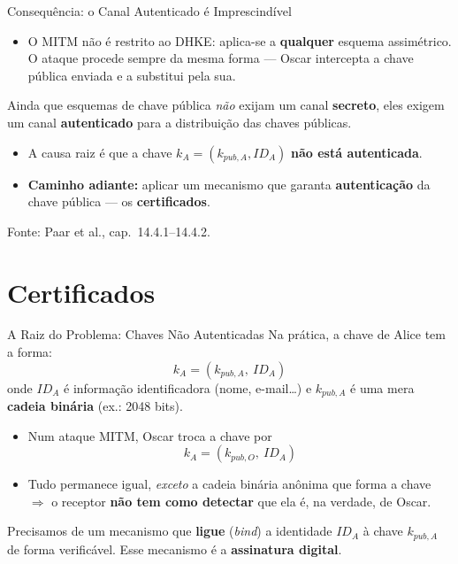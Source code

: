 \documentclass{beamer}
\begin{document}
\begin{frame}{Consequência: o Canal Autenticado é Imprescindível}
    \begin{itemize}
        \item O MITM \alert{não} é restrito ao DHKE: aplica-se a \textbf{qualquer} esquema assimétrico. O ataque procede sempre da mesma forma --- Oscar intercepta a chave pública enviada e a substitui pela sua.
    \end{itemize}
    \medskip
    \begin{tcolorbox}[colback=red!5,colframe=red!60!black,boxrule=0.5pt]
        \centering\footnotesize
        Ainda que esquemas de chave pública \emph{não} exijam um canal \textbf{secreto}, eles exigem um canal \textbf{autenticado} para a distribuição das chaves públicas.
    \end{tcolorbox}
    \medskip
    \begin{itemize}
        \footnotesize
        \item A causa raiz é que a chave $k_{A} = (k_{pub,A}, ID_A)$ \textbf{não está autenticada}.
        \item \textbf{Caminho adiante:} aplicar um mecanismo que garanta \textbf{autenticação} da chave pública --- os \textbf{certificados}.
    \end{itemize}
    \smallskip
    {\tiny Fonte: Paar et al., cap.\ 14.4.1--14.4.2.}
\end{frame}

\section{Certificados}

\begin{frame}{A Raiz do Problema: Chaves Não Autenticadas}
    Na prática, a chave de Alice tem a forma:
    \[ k_{A} = (k_{pub,A},\ ID_A) \]
    onde $ID_A$ é informação identificadora (nome, e-mail\dots) e $k_{pub,A}$ é uma mera \textbf{cadeia binária} (ex.: 2048 bits).
    \medskip
    \begin{itemize}
        \footnotesize
        \item Num ataque MITM, Oscar troca a chave por \[ k_{A} = (k_{pub,O},\ ID_A) \]
        \item Tudo permanece igual, \emph{exceto} a cadeia binária anônima que forma a chave $\Rightarrow$ o receptor \textbf{não tem como detectar} que ela é, na verdade, de Oscar.
    \end{itemize}
    \medskip
    \begin{tcolorbox}[colback=blue!5,colframe=blue!50!black,boxrule=0.5pt]
        \footnotesize
        Precisamos de um mecanismo que \textbf{ligue} (\textit{bind}) a identidade $ID_A$ à chave $k_{pub,A}$ de forma verificável. Esse mecanismo é a \textbf{assinatura digital}.
    \end{tcolorbox}
\end{frame}
\end{document}
